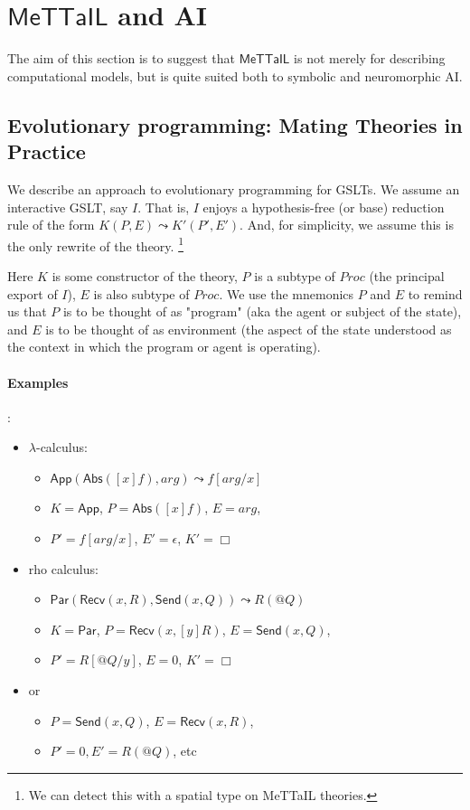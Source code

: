 \documentclass{article}
\begin{document}
\section{$\mathsf{MeTTaIL}$ and AI}

The aim of this section is to suggest that $\mathsf{MeTTaIL}$ is not
merely for describing computational models, but is quite suited both
to symbolic and neuromorphic AI.

\subsection{Evolutionary programming: Mating Theories in Practice}

We describe an approach to evolutionary programming for GSLTs.  We
assume an interactive GSLT, say $I$. That is, $I$ enjoys a
hypothesis-free (or base) reduction rule of the form $K( P, E ) \leadsto K'(
P', E' )$.  And, for simplicity, we assume this is the only rewrite of
the theory. \footnote{We can detect this with a spatial type on
MeTTaIL theories.}

Here $K$ is some constructor of the theory, $P$ is a subtype of $Proc$
(the principal export of $I$), $E$ is also subtype of $Proc$. We use the
mnemonics $P$ and $E$ to remind us that $P$ is to be thought of as
"program" (aka the agent or subject of the state), and $E$ is to be
thought of as environment (the aspect of the state understood as
the context in which the program or agent is operating).

\paragraph{Examples}:
\begin{itemize}
\item $\lambda$-calculus:
  \begin{itemize}
  \item $\mathsf{App}( \mathsf{Abs}( [x]f ), arg ) \leadsto f[ arg / x ]$
  \item $K = \mathsf{App}$, $P = \mathsf{Abs}( [x]f )$, $E = arg$,
  \item $P' = f[ arg / x ]$, $E' = \epsilon$, $K' = \Box$  
  \end{itemize}
\item rho calculus:
  \begin{itemize}
    \item $\mathsf{Par}( \mathsf{Recv}( x, R ), \mathsf{Send}( x, Q ) ) \leadsto R( @Q )$
    \item $K = \mathsf{Par}$, $P = \mathsf{Recv}( x, [y]R )$, $E = \mathsf{Send}( x, Q )$,
    \item $P' = R[ @Q / y ]$, $E = 0$, $K' = \Box$    
  \end{itemize}
\item or
  \begin{itemize}
  \item $P = \mathsf{Send}( x, Q )$, $E = \mathsf{Recv}( x, R )$,
  \item $P' = 0, E' = R( @Q )$, etc
  \end{itemize}
\end{itemize}
\end{document}
